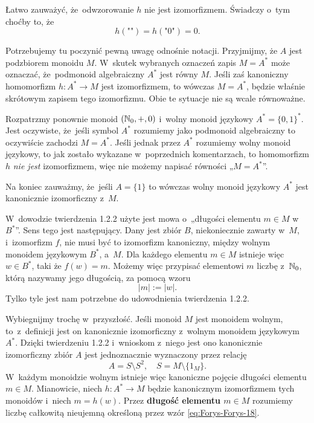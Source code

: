 \documentclass[a4paper,11pt]{article}
\begin{document}
Łatwo zauważyć, że~odwzorowanie $h$ nie jest izomorfizmem. Świadczy o~tym
choćby to, że
\begin{equation}
  \label{eq:Forys-Forys-16}
  h( \textrm{""} ) = h( \textrm{"} 0 \textrm{"} ) = 0.
\end{equation}

\vspace{\spaceFour}



\start {} Potrzebujemy tu poczynić pewną uwagę odnośnie notacji.
Przyjmijmy, że $A$ jest podzbiorem monoidu $M$. W~skutek wybranych oznaczeń
zapis $M = A^{ * }$ może oznaczać, że~podmonoid algebraiczny $A^{ * }$ jest
równy $M$. Jeśli zaś kanoniczny homomorfizm $h : A^{ * } \to M$ jest
izomorfizmem, to wówczas $M = A^{ * }$, będzie właśnie skrótowym zapisem tego
izomorfizmu. Obie te sytuacje nie są wcale równoważne.

Rozpatrzmy ponownie monoid $( \mathbb{N}_{ 0 }, +, 0 )$ i~wolny monoid językowy
$A^{ * } = \{ 0, 1 \}^{ * }$. Jest oczywiste, że~jeśli symbol $A^{ * }$ rozumiemy
jako podmonoid algebraiczny to oczywiście zachodzi $M = A^{ * }$.
Jeśli jednak przez $A^{ * }$ rozumiemy wolny monoid językowy, to jak zostało
wykazane w~poprzednich komentarzach, to homomorfizm $h$ \textit{nie jest}
izomorfizmem, więc nie możemy napisać równości „$M = A^{ * }$”.

Na koniec zauważmy, że~jeśli $A = \{ 1 \}$ to wówczas wolny monoid językowy
$A^{ * }$ jest kanonicznie izomorficzny z~$M$.

\vspace{\spaceFour}



\start {} W~dowodzie twierdzenia 1.2.2 użyte jest mowa o~„długości elementu $m \in M$ w~$B^{ * }$”. Sens tego jest następujący. Dany jest zbiór $B$, niekoniecznie zawarty w~$M$, i~izomorfizm $f$, nie musi być to izomorfizm kanoniczny, między wolnym monoidem językowym $B^{ * }$, a~$M$. Dla każdego elementu $m \in M$ istnieje więc $w \in B^{ * }$, taki że $f( w ) = m$. Możemy więc przypisać elementowi $m$ liczbę z~$\mathbb{N}_{ 0 }$, którą nazywamy jego długością, za pomocą wzoru
\begin{equation}
  \label{eq:Forys-Forys-17}
  | m | := | w |.
\end{equation}
Tylko tyle jest nam potrzebne do udowodnienia twierdzenia 1.2.2.

Wybiegnijmy trochę w~przyszłość. Jeśli monoid $M$ jest monoidem wolnym, to~z~definicji jest on kanonicznie izomorficzny z~wolnym monoidem językowym $A^{ * }$. Dzięki twierdzeniu 1.2.2 i~wnioskom z~niego jest ono kanonicznie izomorficzny zbiór $A$ jest jednoznacznie wyznaczony przez relację
\begin{equation}
  \label{eq:Forys-Forys-18}
  A = S \setminus S^{ 2 }, \quad
  S = M \setminus \{ 1_{ M } \}.
\end{equation}
W~każdym monoidzie wolnym istnieje więc kanoniczne pojęcie długości
elementu $m \in M$. Mianowicie, niech $h : A^{ * } \to M$ będzie kanonicznym
izomorfizmem tych monoidów i~niech $m = h( w )$. Przez \textbf{długość
  elementu $m \in M$} rozumiemy liczbę całkowitą nieujemną określoną przez
wzór \eqref{eq:Forys-Forys-18}.
\end{document}
